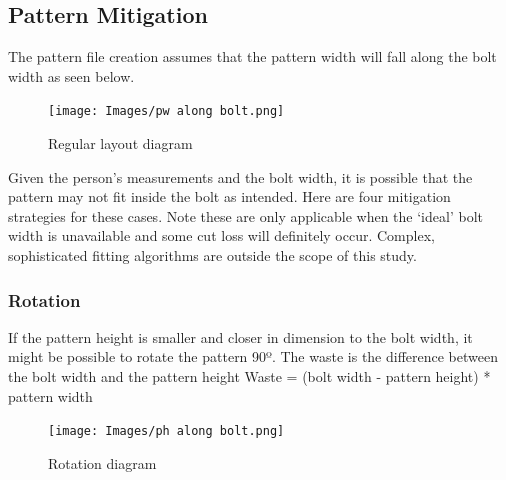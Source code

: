 \subsection{Pattern Mitigation}
The pattern file creation assumes that the pattern width will fall along the bolt width as seen below.
\begin{figure} [H] %
    \centering %
    \texttt{[image: Images/pw along bolt.png]} %
    \caption{Regular layout diagram}
    \label{} %
\end{figure}
Given the person’s measurements and the bolt width, it is possible that the pattern may not fit inside the bolt as intended. Here are four mitigation strategies for these cases. Note these are only applicable when the ‘ideal’ bolt width is unavailable and some cut loss will definitely occur. Complex, sophisticated fitting algorithms are outside the scope of this study.
\subsubsection{Rotation}
If the pattern height is smaller and closer in dimension to the bolt width, it might be possible to rotate the pattern 90º.
The waste is the difference between the bolt width and the pattern height \newline
Waste = (bolt width - pattern height) * pattern width
\begin{figure} [H] %
    \centering %
    \texttt{[image: Images/ph along bolt.png]} %
    \caption{Rotation diagram}
    \label{} %
\end{figure}

